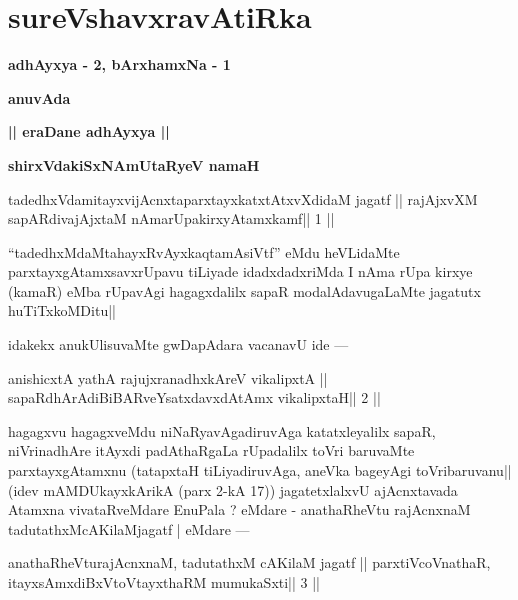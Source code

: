 \chapter{sureVshavxravAtiRka}

\begin{center}
{\Large\textbf{adhAyxya - 2, bArxhamxNa - 1}}
\medskip

{\large\textbf{anuvAda}}
\medskip

{\large\textbf{|| eraDane adhAyxya ||}}
\end{center}

\begin{center}
\centerline{\bf shirxVdakiSxNAmUtaRyeV namaH}
\medskip
\end{center}


\begin{shl}
tadedhxVdamitayxvijAcnxtaparxtayxkatxtAtxvXdidaM jagatf ||
rajAjxvXM sapARdivajAjxtaM nAmarUpakirxyAtamxkamf\hfill || 1 ||
\end{shl}

\begin{artha}
``tadedhxMdaMtahayxRvAyxkaqtamAsiVtf'' eMdu heVLidaMte parxtayxgAtamxsavxrUpavu tiLiyade idadxdadxriMda I nAma rUpa kirxye (kamaR) eMba rUpavAgi hagagxdalilx sapaR modalAdavugaLaMte jagatutx huTiTxkoMDitu||
\end{artha} 
 
\begin{artha}
idakekx anukUlisuvaMte gwDapAdara vacanavU ide ---
\end{artha} 

\begin{shl}
anishicxtA yathA rajujxranadhxkAreV vikalipxtA ||
sapaRdhArAdiBiBARveYsatxdavxdAtAmx vikalipxtaH\hfill || 2 ||
\end{shl}

\begin{artha}
hagagxvu hagagxveMdu niNaRyavAgadiruvAga katatxleyalilx sapaR, niVrinadhAre itAyxdi padAthaRgaLa rUpadalilx toVri baruvaMte parxtayxgAtamxnu (tatapxtaH tiLiyadiruvAga, aneVka bageyAgi toVribaruvanu|| (idev mAMDUkayxkArikA (parx 2-kA 17)) jagatetxlalxvU ajAcnxtavada Atamxna vivataRveMdare EnuPala ? eMdare - anathaRheVtu rajAcnxnaM tadutathxMcAKilaMjagatf | eMdare ---
\end{artha}

\begin{shl}
anathaRheVturajAcnxnaM, tadutathxM cAKilaM jagatf ||
parxtiVcoV\s nathaR, itayxsAmxdiBxVtoV\s tayxthaRM mumukaSxti\hfill || 3 ||
\end{shl}

